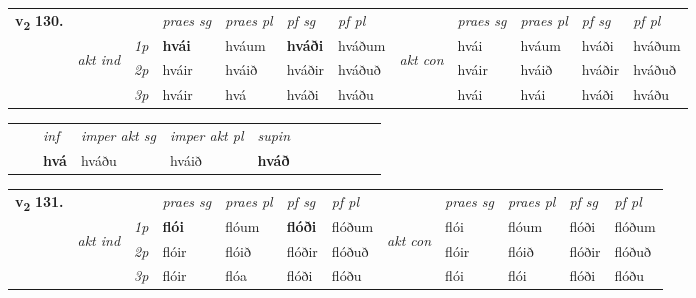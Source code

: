 \begin{tabular}{llllllllllll} \toprule
\multirow{4}{*}{{{\textbf{v{\textsubscript{2}}} \Large{\textbf{130.}}}}}  & &   &  \textit{praes sg}  & \textit{praes pl}  &\textit{ pf sg} & \textit{pf pl} &  &  \textit{praes sg}  & \textit{praes pl}  & \textit{pf sg} & \textit{pf pl } \\*
	\cmidrule{4-7} \cmidrule{9-12}
 & \multirow{3}{*}{\begin{turn}{90}\textit{akt ind}\end{turn}} & {\textit{1p}} & \textbf{hvái} & hváum    & \textbf{hváði} & hváðum & \multirow{3}{*}{\begin{turn}{90}\textit{akt con}\end{turn}} &hvái & hváum & hváði & hváðum\\*
& &  {\textit{2p}} &  hváir  & hváið   & hváðir & hváðuð & & hváir & hváið & hváðir & hváðuð \\*
& &  {\textit{3p}} & hváir & hvá   & hváði & hváðu & & hvái & hvái& hváði & hváðu  \\*
\cmidrule{4-7} \cmidrule{9-12}
\end{tabular}


\begin{tabular}{llllllllllll}
 & & \textit{inf} & \textit{imper akt sg} & \textit{imper akt pl}    & \textit{supin}       \\*
  & & \textbf{hvá} & hváðu  & hváið    &  \textbf{hváð}   \\*
\cmidrule{1-12}
\end{tabular}



\begin{tabular}{llllllllllll} \toprule
\multirow{4}{*}{{{\textbf{v{\textsubscript{2}}} \Large{\textbf{131.}}}}}  & &   &  \textit{praes sg}  & \textit{praes pl}  &\textit{ pf sg} & \textit{pf pl} &  &  \textit{praes sg}  & \textit{praes pl}  & \textit{pf sg} & \textit{pf pl } \\*
	\cmidrule{4-7} \cmidrule{9-12}
 & \multirow{3}{*}{\begin{turn}{90}\textit{akt ind}\end{turn}} & {\textit{1p}} & \textbf{flói} & flóum    & \textbf{flóði} & flóðum & \multirow{3}{*}{\begin{turn}{90}\textit{akt con}\end{turn}} &flói & flóum & flóði & flóðum\\*
& &  {\textit{2p}} &  flóir  & flóið   & flóðir & flóðuð & & flóir & flóið & flóðir & flóðuð \\*
& &  {\textit{3p}} & flóir & flóa   & flóði & flóðu & & flói & flói& flóði & flóðu  \\*
\cmidrule{4-7} \cmidrule{9-12}
\end{tabular}


